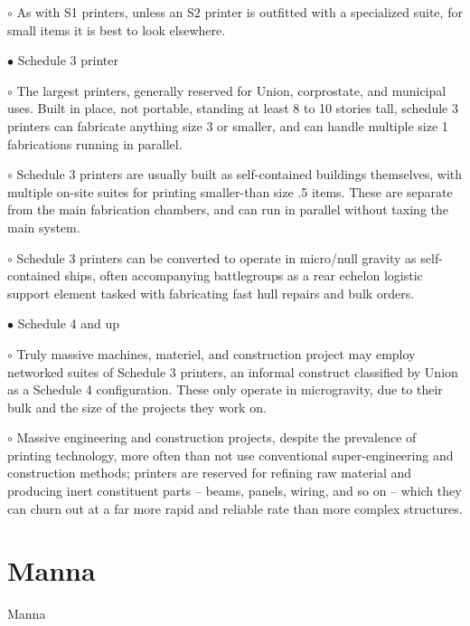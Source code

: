          $\circ$     As with S1 printers, unless an S2 printer is outfitted with a specialized suite, for  
             small items it is best to look elsewhere.   
 
$\bullet$    Schedule 3 printer 
 
         $\circ$     The largest printers, generally reserved for Union, corprostate, and municipal  
             uses. Built in place, not portable, standing at least 8 to 10 stories tall, schedule 3  
             printers can fabricate anything size 3 or smaller, and can handle multiple size 1  
             fabrications running in parallel. 
 
         $\circ$     Schedule 3 printers are usually built as self-contained buildings themselves, with  
             multiple on-site suites for printing smaller-than size .5 items. These are separate  
             from the main fabrication chambers, and can run in parallel without taxing the  
             main system. 
 
         $\circ$     Schedule 3 printers can be converted to operate in micro/null gravity as self- 
             contained ships, often accompanying battlegroups as a rear echelon logistic  
             support element tasked with fabricating fast hull repairs and bulk orders.  
 
$\bullet$    Schedule 4 and up
 
         $\circ$   Truly massive machines, materiel, and construction project may employ  
             networked suites of Schedule 3 printers, an informal construct classified by Union  
             as a Schedule 4 configuration. These only operate in microgravity, due to their  
             bulk and the size of the projects they work on. 
 
         $\circ$     Massive engineering and construction projects, despite the prevalence of printing  
             technology, more often than not use conventional super-engineering and  
             construction methods; printers are reserved for refining raw material and  
             producing inert constituent parts -- beams, panels, wiring, and so on -- which they  
             can churn out at a far more rapid and reliable rate than more complex structures. 
 

                                                                                                               

\section{Manna}
Manna  

